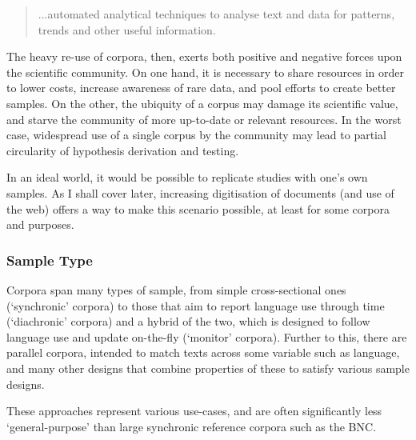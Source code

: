 \begin{quote}
...automated analytical techniques to analyse text and data for patterns, trends and other useful information.
\end{quote}




The heavy re-use of corpora, then, exerts both positive and negative forces upon the scientific community.  On one hand, it is necessary to share resources in order to lower costs, increase awareness of rare data, and pool efforts to create better samples.  On the other, the ubiquity of a corpus may damage its scientific value, and starve the community of more up-to-date or relevant resources.  In the worst case, widespread use of a single corpus by the community may lead to partial circularity of hypothesis derivation and testing.


In an ideal world, it would be possible to replicate studies with one's own samples.  As I shall cover later, increasing digitisation of documents (and use of the web) offers a way to make this scenario possible, at least for some corpora and purposes.



\subsubsection{Sample Type}
Corpora span many types of sample, from simple cross-sectional ones (`synchronic' corpora) to those that aim to report language use through time (`diachronic' corpora) and a hybrid of the two, which is designed to follow language use and update on-the-fly (`monitor' corpora).  Further to this, there are parallel corpora, intended to match texts across some variable such as language\cite{koehn2005europarl,mcenery2007parallel}, and many other designs that combine properties of these to satisfy various sample designs.

These approaches represent various use-cases, and are often significantly less `general-purpose' than large synchronic reference corpora such as the BNC.








